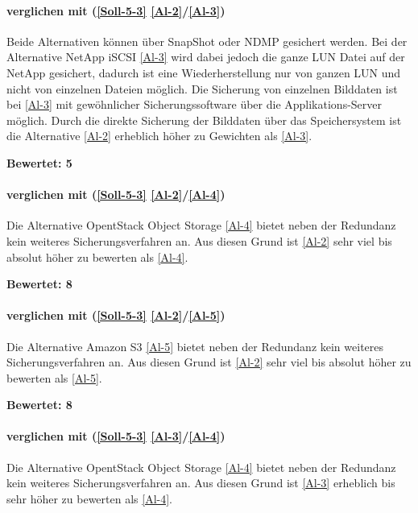 \paragraph*{  verglichen mit  (\ref{Soll-5-3} \ref{Al-2}/\ref{Al-3})}
Beide Alternativen können über SnapShot oder NDMP gesichert werden. Bei der Alternative NetApp iSCSI \ref{Al-3} wird dabei jedoch die ganze LUN Datei auf der NetApp gesichert, dadurch ist eine Wiederherstellung nur von ganzen LUN und nicht von einzelnen Dateien möglich. Die Sicherung von einzelnen Bilddaten ist bei \ref{Al-3} mit gewöhnlicher Sicherungssoftware über die Applikations-Server möglich.
Durch die direkte Sicherung der Bilddaten über das Speichersystem ist die Alternative  \ref{Al-2} erheblich höher zu Gewichten als  \ref{Al-3}.

\textbf{Bewertet: 5}

\paragraph*{  verglichen mit  (\ref{Soll-5-3} \ref{Al-2}/\ref{Al-4})}
Die Alternative OpentStack Object Storage \ref{Al-4} bietet neben der Redundanz kein weiteres Sicherungsverfahren an. Aus diesen Grund ist  \ref{Al-2} sehr viel bis absolut höher zu bewerten als  \ref{Al-4}.

\textbf{Bewertet: 8}

\paragraph*{  verglichen mit  (\ref{Soll-5-3} \ref{Al-2}/\ref{Al-5})}
Die Alternative Amazon S3 \ref{Al-5} bietet neben der Redundanz kein weiteres Sicherungsverfahren an. Aus diesen Grund ist  \ref{Al-2} sehr viel bis absolut höher zu bewerten als  \ref{Al-5}.

\textbf{Bewertet: 8}

\paragraph*{  verglichen mit  (\ref{Soll-5-3} \ref{Al-3}/\ref{Al-4})}
Die Alternative OpentStack Object Storage \ref{Al-4} bietet neben der Redundanz kein weiteres Sicherungsverfahren an. Aus diesen Grund ist  \ref{Al-3} erheblich bis sehr höher zu bewerten als  \ref{Al-4}.

